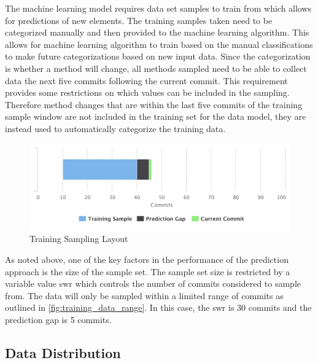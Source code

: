 The machine learning model requires data set samples to train from which allows for predictions of new elements. The training samples taken need to be categorized manually and then provided to the machine learning algorithm. This allows for machine learning algorithm to train based on the manual classifications to make future categorizations based on new input data. Since the categorization is whether a method will change, all methods sampled need to be able to collect data the next five commits following the current commit. This requirement provides some restrictions on which values can be included in the sampling. Therefore method changes that are within the last five commits of the training sample window are not included in the training set for the data model, they are instead used to automatically categorize the training data.

\begin{figure}[!ht]
    \centering
        \includegraphics[width=1.0\textwidth]{images/training_sampling}
    \caption{Training Sampling Layout}
    \label{fig:training_data_range}
\end{figure}

As noted above, one of the key factors in the performance of the prediction approach is the size of the sample set. The sample set size is restricted by a variable value \gls{swr} which controls the number of commits considered to sample from. The data will only be sampled within a limited range of commits as outlined in \autoref{fig:training_data_range}. In this case, the \gls{swr} is 30 commits and the prediction gap is 5 commits.

\subsection{Data Distribution}
\label{subsec:data_distribution}

